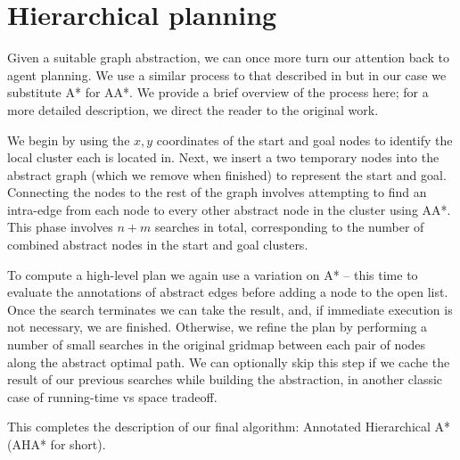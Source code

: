 \section{Hierarchical planning}
Given a suitable graph abstraction, we can once more turn our attention back to agent planning. 
We use a similar process to that described in \cite{botea04} but in our case we substitute A* for AA*.
We provide a brief overview of the process here; for a more detailed description, we direct the reader to the original work.
\par \indent
We begin by using the $x,y$ coordinates of the start and goal  nodes to identify the local cluster each is located in. 
Next, we insert a two temporary nodes into the abstract graph (which we remove when finished) to represent the start and goal.
Connecting the nodes to the rest of the graph involves attempting to find an intra-edge from each node to every other abstract node in the cluster using AA*. 
This phase involves $n+m$ searches in total, corresponding to the number of combined abstract nodes in the start and goal clusters.
\par \indent
To compute a high-level plan we again use a variation on A* -- this time to evaluate the annotations of abstract edges before adding a node to the open list.
Once the search terminates we can take the result, and, if immediate execution is not necessary, we are finished. 
Otherwise, we refine the plan by performing a number of small searches in the original gridmap between each pair of nodes along the abstract optimal path. 
We can optionally skip this step if we cache the result of our previous searches while building the abstraction, in another classic case of running-time vs space tradeoff. 
\par \indent
This completes the description of our final algorithm: Annotated Hierarchical A* (AHA* for short).
